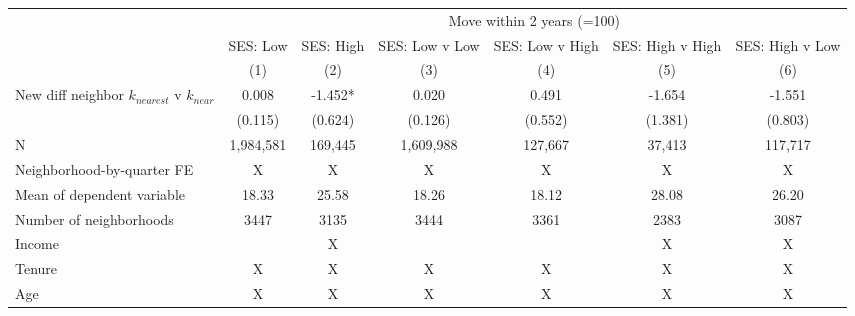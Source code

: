 \begin{tabular}{lcccccc}
\toprule
 & \multicolumn{6}{c}{Move within 2 years (=100)} \\ 
\cmidrule(lr){2-7}
 & SES: Low & SES: High & SES: Low v Low & SES: Low v High & SES: High v High & SES: High v Low \\ 
\cmidrule(lr){2-2} \cmidrule(lr){3-3} \cmidrule(lr){4-4} \cmidrule(lr){5-5} \cmidrule(lr){6-6} \cmidrule(lr){7-7}
  & (1) & (2) & (3) & (4) & (5) & (6) \\ 
\midrule
New diff neighbor $k_{nearest}$ v $k_{near}$ & 0.008 & -1.452* & 0.020 & 0.491 & -1.654 & -1.551 \\ 
 & (0.115) & (0.624) & (0.126) & (0.552) & (1.381) & (0.803) \\ 
N & 1,984,581 & 169,445 & 1,609,988 & 127,667 & 37,413 & 117,717 \\ 
Neighborhood-by-quarter FE & X & X & X & X & X & X \\ 
Mean of dependent variable & 18.33 & 25.58 & 18.26 & 18.12 & 28.08 & 26.20 \\ 
Number of neighborhoods & 3447 & 3135 & 3444 & 3361 & 2383 & 3087 \\ 
Income &  & X &  &  & X & X \\ 
Tenure & X & X & X & X & X & X \\ 
Age & X & X & X & X & X & X \\ 
\bottomrule
\end{tabular}